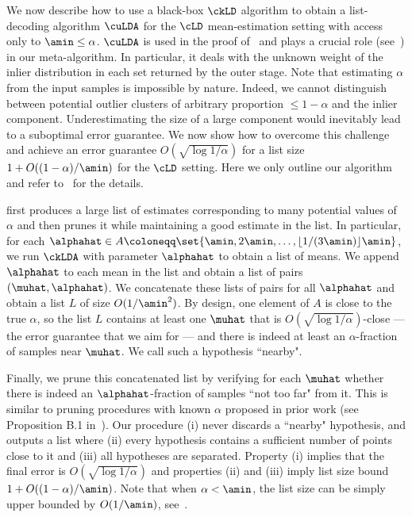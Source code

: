We now describe how to use a black-box $\ckLD$ algorithm to obtain a list-decoding algorithm $\cuLDA$ for the $\cLD$ mean-estimation setting with access only to $\amin \leq \alpha$.
\(\cuLDA\) is used in the proof of~  and plays a crucial role (see~) in our meta-algorithm. In particular, it deals with the unknown weight of the inlier distribution in each set returned by the outer stage.
Note that 
estimating $\alpha$ from the input samples is impossible by nature. Indeed, we cannot distinguish between potential outlier clusters of arbitrary proportion $\leq 1-\alpha$ and the inlier component.
Underestimating the size of a large component would inevitably lead to a suboptimal error guarantee.
We now show how  to overcome this challenge and achieve an error guarantee
\(O(\sqrt{\log 1 / \alpha})\) for a list size \(1 + O((1 - \alpha) / \amin)\) for the $\cLD$ setting. Here we only outline our algorithm and refer to~ for the details.

 first produces a large list of estimates corresponding to many potential values of $\alpha$ and then prunes it while maintaining a good estimate in the list.
In particular, for each $\alphahat \in A \coloneqq \set{\amin,2\amin, \ldots,\lfloor 1/(3\amin) \rfloor \amin}$, we run \(\ckLDA\) with parameter $\alphahat$ to obtain a list of means.
We append $\alphahat$ to each mean in the list and obtain a list of pairs $(\muhat,\alphahat)$.
We concatenate these lists of pairs for all $\alphahat$ and obtain a list $L$ of size $O(1 / \amin^2)$.
By design, one element of $A$ is close to the true $\alpha$,
so the list $L$ contains at least one $\muhat$ that is $O(\sqrt{\log 1/\alpha})$-close ---  the error guarantee that we aim for --- and there is indeed at least an \(\alpha\)-fraction of samples near \(\muhat\).
We call such a hypothesis ``nearby".

Finally, we prune this concatenated list by verifying for each \(\muhat\) whether there is indeed an \(\alphahat\)-fraction of samples ``not too far" from it.
This is similar to pruning procedures with known $\alpha$ proposed in prior work (see Proposition B.1 in~\cite{diakonikolas2018list}).
Our procedure
(i) never discards a ``nearby" hypothesis, and outputs a list where (ii) every hypothesis contains a sufficient number of points close to it and (iii) all hypotheses are separated.
Property (i) implies that the final error is \(O(\sqrt{\log 1 / \alpha})\) and properties (ii) and (iii) imply list size bound \(1 + O((1 - \alpha) / \amin)\). Note that when $\alpha < \amin$, the list size can be simply upper bounded by $O(1/\amin)$, see~.

